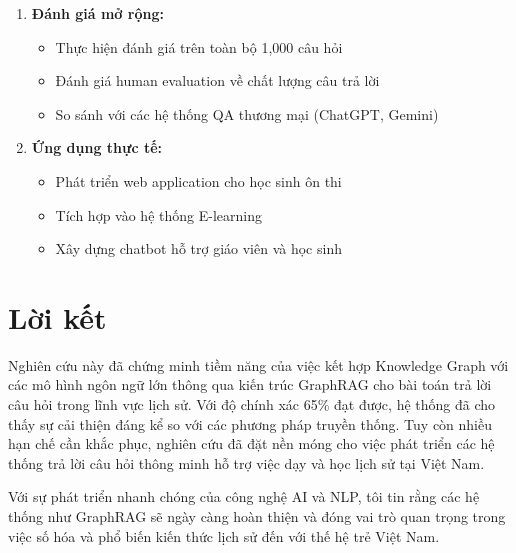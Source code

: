 \begin{enumerate}
    \item \textbf{Đánh giá mở rộng:}
    \begin{itemize}
        \item Thực hiện đánh giá trên toàn bộ 1,000 câu hỏi
        \item Đánh giá human evaluation về chất lượng câu trả lời
        \item So sánh với các hệ thống QA thương mại (ChatGPT, Gemini)
    \end{itemize}
    
    \item \textbf{Ứng dụng thực tế:}
    \begin{itemize}
        \item Phát triển web application cho học sinh ôn thi
        \item Tích hợp vào hệ thống E-learning
        \item Xây dựng chatbot hỗ trợ giáo viên và học sinh
    \end{itemize}
\end{enumerate}

\section{Lời kết}

Nghiên cứu này đã chứng minh tiềm năng của việc kết hợp Knowledge Graph với các mô hình ngôn ngữ lớn thông qua kiến trúc GraphRAG cho bài toán trả lời câu hỏi trong lĩnh vực lịch sử. Với độ chính xác 65\% đạt được, hệ thống đã cho thấy sự cải thiện đáng kể so với các phương pháp truyền thống. Tuy còn nhiều hạn chế cần khắc phục, nghiên cứu đã đặt nền móng cho việc phát triển các hệ thống trả lời câu hỏi thông minh hỗ trợ việc dạy và học lịch sử tại Việt Nam.

Với sự phát triển nhanh chóng của công nghệ AI và NLP, tôi tin rằng các hệ thống như GraphRAG sẽ ngày càng hoàn thiện và đóng vai trò quan trọng trong việc số hóa và phổ biến kiến thức lịch sử đến với thế hệ trẻ Việt Nam.
